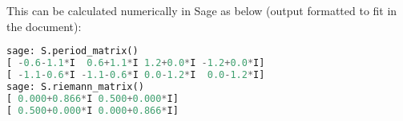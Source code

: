 \documentclass{article}
\begin{document}
\begin{comment}
\eq{
\Omega = \begin{pmatrix} (1-\zeta)B\pround{\frac{1}{2}, \frac{1}{6}} & \zeta^{-15} (1-\zeta)B\pround{\frac{1}{2}, \frac{1}{6}} & -\zeta^{-10} (1-\zeta)B\pround{\frac{1}{2}, \frac{1}{6}} & -\zeta^{-25} (1-\zeta)B\pround{\frac{1}{2}, \frac{1}{6}} \\ (1-\zeta^2)B\pround{\frac{1}{2}, \frac{1}{3}} & \zeta^{-12} (1-\zeta^2)B\pround{\frac{1}{2}, \frac{1}{3}} & -\zeta^{-8} (1-\zeta^2)B\pround{\frac{1}{2}, \frac{1}{3}} & -\zeta^{-20} (1-\zeta^2)B\pround{\frac{1}{2}, \frac{1}{3}}\end{pmatrix}
}
We can calculate 
\eq{
\frac{B\pround{\frac{1}{2}, \frac{1}{6}}}{B\pround{\frac{1}{2}, \frac{1}{3}}} &= \frac{\Gamma(1/2) \Gamma(1/6)}{\Gamma(2/3)} \frac{\Gamma(5/6)}{\Gamma(1/2)\Gamma(1/3)} = \frac{\pi/\sin(\pi/6)}{\pi/\sin(\pi/3)} =\sqrt{3}
}
and so 
\eq{
\Omega \propto \begin{pmatrix} \sqrt{3} & -\sqrt{3} &  -\sqrt{3}\zeta^2  & -\sqrt{3}\zeta^5 \\ 1+\zeta & 1+\zeta & -\zeta^4(1+\zeta) & -\zeta^4(1+\zeta) \end{pmatrix}
}

This means we can calculate the Riemann matrix to be 
\eq{
\tau = \frac{1}{2\sqrt{3}(1+\zeta)}\begin{pmatrix} 1+\zeta & \sqrt{3} \\ -(1+\zeta) & \sqrt{3} \end{pmatrix} \begin{pmatrix} -\sqrt{3}\zeta^2 &  \sqrt{3} \zeta^2 \\ \zeta(1+\zeta) & \zeta(1+\zeta) \end{pmatrix} &= \frac{\zeta}{2}\begin{pmatrix}1-\zeta & 1+\zeta \\ 1+\zeta & 1-\zeta \end{pmatrix} \\
  &= \frac{1}{2}\begin{pmatrix} 1 & \sqrt{3}i \\ \sqrt{3}i & 1 \end{pmatrix}
}
 \\
\end{comment}
This can be calculated numerically in Sage as below (output formatted to fit in the document):
\begin{lstlisting}[language=Python,frame=single]
sage: S.period_matrix()
[ -0.6-1.1*I  0.6+1.1*I 1.2+0.0*I -1.2+0.0*I]
[ -1.1-0.6*I -1.1-0.6*I 0.0-1.2*I  0.0-1.2*I]
sage: S.riemann_matrix()
[ 0.000+0.866*I 0.500+0.000*I]
[ 0.500+0.000*I 0.000+0.866*I]
\end{lstlisting}
\end{document}
